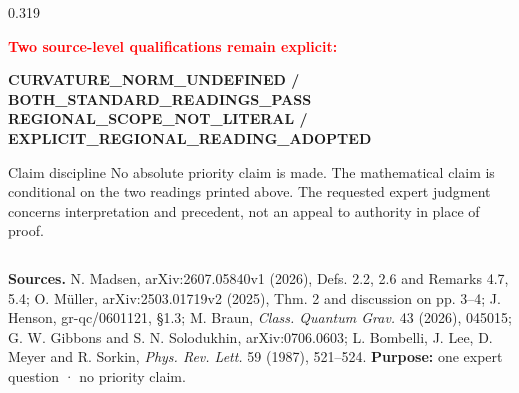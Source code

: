 \documentclass[final]{beamer}
\newcommand{\warn}[1]{\textcolor{Red}{\bfseries #1}}
\begin{document}
\begin{frame}[t]
\begin{columns}[T,totalwidth=\textwidth]
\begin{column}{0.319\textwidth}
\begin{scopebox}
  \warn{Two source-level qualifications remain explicit:}
  \vspace{3mm}
  \begin{center}
  {\ttfamily\bfseries\fontsize{16}{20}\selectfont
    CURVATURE\_NORM\_UNDEFINED / BOTH\_STANDARD\_READINGS\_PASS\\[2mm]
    REGIONAL\_SCOPE\_NOT\_LITERAL / EXPLICIT\_REGIONAL\_READING\_ADOPTED}
  \end{center}
\end{scopebox}

\begin{posterbox}[colback=Navy,colframe=Navy,coltitle=White]{Claim discipline}
  \color{White}
  No absolute priority claim is made. The mathematical claim is conditional on the two readings
  printed above. The requested expert judgment concerns interpretation and precedent, not an appeal
  to authority in place of proof.
\end{posterbox}

\end{column}
\end{columns}

\vfill

\begin{tcolorbox}[
  enhanced,colback=NavyTwo,colframe=NavyTwo,boxrule=0pt,arc=0mm,
  left=10mm,right=10mm,top=5mm,bottom=5mm,width=\textwidth
]
{\fontsize{14.2}{18}\selectfont\color{White}
\textbf{Sources.}
N. Madsen, arXiv:2607.05840v1 (2026), Defs. 2.2, 2.6 and Remarks 4.7, 5.4;
O. Müller, arXiv:2503.01719v2 (2025), Thm. 2 and discussion on pp. 3--4;
J. Henson, gr-qc/0601121, §1.3;
M. Braun, \emph{Class. Quantum Grav.} 43 (2026), 045015;
G. W. Gibbons and S. N. Solodukhin, arXiv:0706.0603;
L. Bombelli, J. Lee, D. Meyer and R. Sorkin, \emph{Phys. Rev. Lett.} 59 (1987), 521--524.
\hfill
\textbf{Purpose:} one expert question · no priority claim.}
\end{tcolorbox}

\end{frame}
\end{document}
